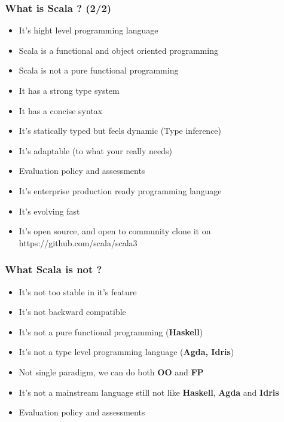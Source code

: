 \documentclass{beamer}
\begin{document}
\begin{frame}
\frametitle{What is Scala ? (2/2) }

\begin{itemize}
    \item It's hight level programming language
    \item Scala is a functional and object oriented programming
    \item Scala is not a pure functional programming
    \item It has a strong type system
    \item It has a concise syntax
    \item It's statically typed but feels dynamic (Type inference)
    \item It's adaptable (to what your really needs)
    \item Evaluation policy and assessments
    \item It's enterprise production ready programming language
    \item It's evolving fast
    \item It's open source, and open to community clone it on https://github.com/scala/scala3
\end{itemize}
\end{frame}


\begin{frame}
\frametitle{What Scala is not ? }

\begin{itemize}
    \item It's not too stable in it's feature
    \item It's not backward compatible
    \item It's not a pure functional programming (\textbf{Haskell})
    \item It's not a type level programming language (\textbf{Agda, Idris})
    \item Not single paradigm, we can do both \textbf{OO} and \textbf{FP} 
    \item It's not a mainstream language still not like \textbf{Haskell}, \textbf{Agda} and \textbf{Idris}
    \item Evaluation policy and assessments
\end{itemize}
\end{frame}


\end{document}
